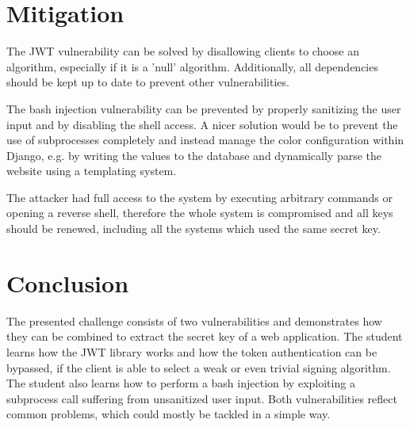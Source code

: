 \documentclass[12pt,a4paper]{article}
\begin{document}
\section{Mitigation}

The JWT vulnerability can be solved by disallowing clients to choose an algorithm, especially if it is a 'null' algorithm. Additionally, all dependencies should be kept up to date to prevent other vulnerabilities.

The bash injection vulnerability can be prevented by properly sanitizing the user input and by disabling the shell access. A nicer solution would be to prevent the use of subprocesses completely and instead manage the color configuration within Django, e.g. by writing the values to the database and dynamically parse the website using a templating system.

The attacker had full access to the system by executing arbitrary commands or opening a reverse shell, therefore the whole system is compromised and all keys should be renewed, including all the systems which used the same secret key.



\section{Conclusion}
The presented challenge consists of two vulnerabilities and demonstrates how they can be combined to extract the secret key of a web application. The student learns how the JWT library works and how the token authentication can be bypassed, if the client is able to select a weak or even trivial signing algorithm.
The student also learns how to perform a bash injection by exploiting a subprocess call suffering from unsanitized user input.
Both vulnerabilities reflect common problems, which could mostly be tackled in a simple way.
\end{document}

